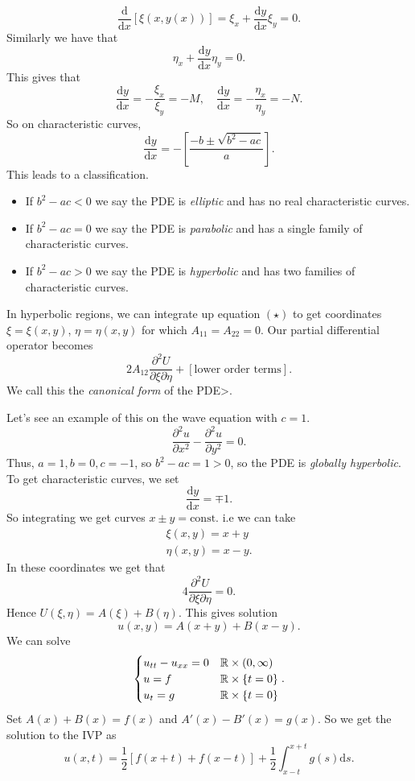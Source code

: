 \documentclass{article}
\begin{document}
\[
	\frac{\mathrm d}{\mathrm dx}[\xi(x,y(x))]=\xi_x+\frac{\mathrm dy}{\mathrm dx}\xi_y=0.
\]
Similarly we have that
\[
	\eta_x+\frac{\mathrm dy}{\mathrm dx}\eta_y=0.
\]
This gives that
\[
	\frac{\mathrm dy}{\mathrm dx}=-\frac{\xi_x}{\xi_y}=-M,\quad \frac{\mathrm dy}{\mathrm dx}=-\frac{\eta_x}{\eta_y}=-N.
\]
So on characteristic curves,
\[
	\frac{\mathrm dy}{\mathrm dx}=-\left[\frac{-b\pm \sqrt{b^2-ac}}a\right].\tag{\star}
\]
This leads to a classification.
\begin{itemize}
	\item If $ b^2-ac<0 $ we say the PDE is \textit{elliptic} and has no real characteristic curves.
	\item If $ b^2-ac=0 $ we say the PDE is \textit{parabolic} and has a single family of characteristic curves.
	\item If $ b^2-ac>0 $ we say the PDE is \textit{hyperbolic} and has two families of characteristic curves.	
\end{itemize}
In hyperbolic regions, we can integrate up equation $ (\star) $ to get coordinates $ \xi=\xi(x,y) $, $ \eta=\eta(x,y) $ for which $ A_{11}=A_{22}=0 $. Our partial differential operator becomes
\[
	2A_{12}\frac{\partial^2 U}{\partial \xi \partial \eta}+[\text{lower order terms}].
\]
We call this the \textit{canonical form} of the PDE>.\par
Let's see an example of this on the wave equation with $ c=1 $.
\[
	\frac{\partial^2 u}{\partial x^2}-\frac{\partial ^2 u}{\partial y^2}=0.
\]
Thus, $ a=1, b=0, c=-1 $, so $ b^2-ac = 1 > 0 $, so the PDE is \textit{globally hyperbolic}. To get characteristic curves, we set
\[
	\frac{\mathrm dy}{\mathrm dx}=\mp 1.
\]
So integrating we get curves $ x\pm y=\text{const.} $ i.e we can take
\begin{align*}
  \xi(x,y)=x+y \\
  \eta(x,y)= x- y.
\end{align*}
In these coordinates we get that
\[
	4\frac{\partial^2 U}{\partial\xi\partial \eta}=0.
\]
Hence $ U(\xi,\eta)=A(\xi)+B(\eta) $. This gives solution
\[
  u(x,y)=A(x+y)+B(x-y).
\]
We can solve
\[
  \begin{cases}
	  u_{tt}-u_{xx}=0 & \mathbb{R}\times (0,\infty) \\
	  u=f & \mathbb{R}\times \{t=0\} \\
	  u_t=g & \mathbb{R}\times \{t=0\}
  \end{cases}.
\]
Set $ A(x)+B(x)=f(x) $ and $ A'(x)-B'(x)=g(x) $. So we get the solution to the IVP as
\[
	u(x,t)=\frac 12[f(x+t)+f(x-t)]+\frac 12 \int_{x-t}^{x+t}g(s)\mathrm ds.
\]
\end{document}
